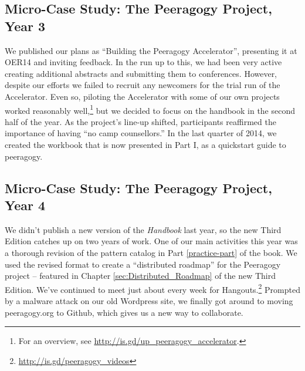 \subsection{{\tiny Micro-}Case Study: The Peeragogy Project, Year 3}

We published our plans as ``Building the Peeragogy Accelerator'',
presenting it at OER14 and inviting feedback.  In the run up to this,
we had been very active creating additional abstracts and submitting
them to conferences.  However, despite our efforts we failed to
recruit any newcomers for the trial run of the Accelerator.  Even so,
piloting the Accelerator with some of our own projects worked
reasonably well,\footnote{For an overview,
see \url{http://is.gd/up_peeragogy_accelerator}.} but we decided to
focus on the handbook in the second half of the year.  As the
project's line-up shifted, participants reaffirmed the importance of
having ``no camp counsellors.''  In the last quarter of 2014, we
created the workbook that is now presented in Part I, as a quickstart
guide to peeragogy.  

\subsection{{\tiny Micro-}Case Study: The Peeragogy Project, Year 4}

We didn't publish a new version of the \emph{Handbook} last year, so
the new Third Edition catches up on two years of work.  One of our
main activities this year was a thorough revision of the pattern
catalog in Part \ref{practice-part} of the book.  We used the revised
format to create a ``distributed roadmap'' for the Peeragogy project
-- featured in Chapter \ref{sec:Distributed_Roadmap} of the new Third
Edition.  We've continued to meet just about every week for
Hangouts.\footnote{\url{http://is.gd/peeragogy_videos}} Prompted by a
malware attack on our old Wordpress site, we finally got around to
moving peeragogy.org to Github, which gives us a new way to
collaborate.

